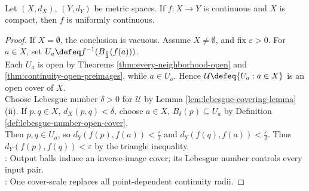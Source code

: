 \begin{theorem} \label{thm:compact-continuity-uniform-continuity} \\
Let $(X,d_X)$, $(Y,d_Y)$ be metric spaces. If $f:X\to Y$ is continuous and $X$ is compact, then $f$ is uniformly continuous.
\begin{proof}
If $X=\emptyset$, the conclusion is vacuous. Assume $X\neq\emptyset$, and fix $\varepsilon>0$. For $a\in X$, set $U_a\defeq f^{-1}(B_{\frac{\varepsilon}{2}}(f(a)))$.\\
Each $U_a$ is open by Theorems \ref{thm:every-neighborhood-open} and \ref{thm:continuity-open-preimages}, while $a\in U_a$. Hence $\mathcal{U}\defeq\{U_a:a\in X\}$ is an open cover of $X$.\\
Choose Lebesgue number $\delta>0$ for $\mathcal{U}$ by Lemma \ref{lem:lebesgue-covering-lemma}(ii). If $p,q\in X$, $d_X(p,q)<\delta$, choose $a\in X$, $B_\delta(p)\subseteq U_a$ by Definition \ref{def:lebesgue-number-open-cover}.\\
Then $p,q\in U_a$, so $d_Y(f(p),f(a))<\frac{\varepsilon}{2}$ and $d_Y(f(q),f(a))<\frac{\varepsilon}{2}$. Thus $d_Y(f(p),f(q))<\varepsilon$ by the triangle inequality.\\
: Output balls induce an inverse-image cover; its Lebesgue number controls every input pair.\\
: One cover-scale replaces all point-dependent continuity radii.
\end{proof}
\end{theorem}

